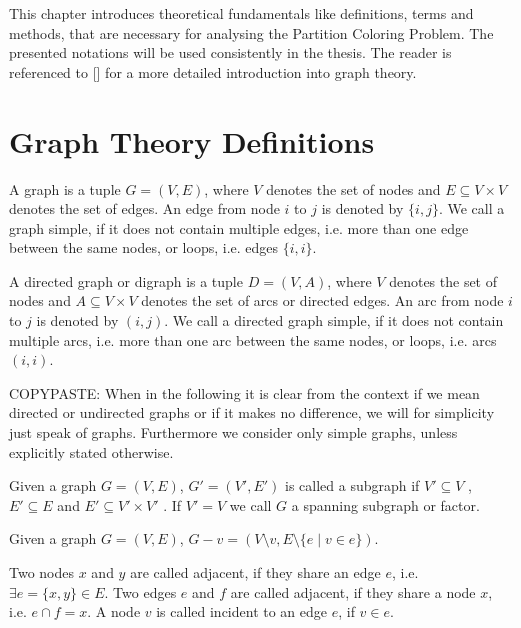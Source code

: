 
This chapter introduces theoretical fundamentals like definitions, terms and methods, that are necessary for analysing the Partition Coloring Problem. The presented notations will be used consistently in the thesis. The reader is referenced to [] for a more detailed introduction into graph theory.


\section{Graph Theory Definitions}

\begin{definition}[Graph]
A graph is a tuple $G = (V, E)$, where $V$ denotes the set of nodes and $E \subseteq V \times V$ denotes the set of edges. An edge from node $i$ to $j$ is denoted by $\{i, j\}$. We call a graph simple, if it does not contain multiple edges, i.e. more than one edge between the same nodes, or loops, i.e. edges $\{i, i\}$.
\end{definition}

\begin{definition}
A directed graph or digraph is a tuple $D = (V, A)$, where $V$ denotes the set of nodes and $A \subseteq V \times V$ denotes the set of arcs
or directed edges. An arc from node $i$ to $j$ is denoted by $(i, j)$. We call a directed graph simple, if it does not contain multiple arcs, i.e. more than one arc between the same nodes, or loops, i.e. arcs $(i, i)$.
\end{definition}

COPYPASTE:
When in the following it is clear from the context if we mean directed or undirected graphs or if it makes no difference, we will for simplicity just speak of graphs. Furthermore we consider only simple graphs, unless explicitly stated otherwise.

\begin{definition}
Given a graph $G = (V, E)$, $G' = (V', E')$ is called a subgraph if $V' \subseteq V$ , $E' \subseteq E$ and $E' \subseteq V' \times V'$ . If  $V' = V$ we call $G$ a spanning subgraph or factor.
\end{definition}

\begin{definition}
Given a graph $G = (V, E)$, $G - v = (V \setminus v, E \setminus \{e \mid v \in e\})$.
\end{definition}

\begin{definition}
Two nodes $x$ and $y$ are called adjacent, if they share an edge $e$, i.e. $\exists e = \{x, y\} \in E$. Two edges $e$ and $f$ are called adjacent, if they share a node $x$, i.e. $e \cap f = x$. A node $v$ is called incident to an edge $e$, if $v \in e$.
\end{definition}

